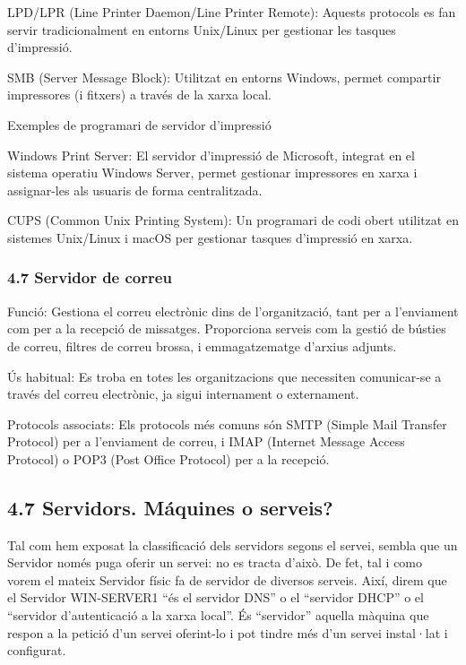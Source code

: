 \documentclass[
  a4paper,
]{article}
\begin{document}
LPD/LPR (Line Printer Daemon/Line Printer Remote): Aquests protocols es
fan servir tradicionalment en entorns Unix/Linux per gestionar les
tasques d'impressió.

SMB (Server Message Block): Utilitzat en entorns Windows, permet
compartir impressores (i fitxers) a través de la xarxa local.

Exemples de programari de servidor d'impressió

Windows Print Server: El servidor d'impressió de Microsoft, integrat en
el sistema operatiu Windows Server, permet gestionar impressores en
xarxa i assignar-les als usuaris de forma centralitzada.

CUPS (Common Unix Printing System): Un programari de codi obert
utilitzat en sistemes Unix/Linux i macOS per gestionar tasques
d'impressió en xarxa.

\subsubsection{4.7 Servidor de correu}\label{servidor-de-correu}

Funció: Gestiona el correu electrònic dins de l'organització, tant per a
l'enviament com per a la recepció de missatges. Proporciona serveis com
la gestió de bústies de correu, filtres de correu brossa, i
emmagatzematge d'arxius adjunts.

Ús habitual: Es troba en totes les organitzacions que necessiten
comunicar-se a través del correu electrònic, ja sigui internament o
externament.

Protocols associats: Els protocols més comuns són SMTP (Simple Mail
Transfer Protocol) per a l'enviament de correu, i IMAP (Internet Message
Access Protocol) o POP3 (Post Office Protocol) per a la recepció.

\subsection{4.7 Servidors. Máquines o
serveis?}\label{servidors.-muxe1quines-o-serveis}

Tal com hem exposat la classificació dels servidors segons el servei,
sembla que un Servidor només puga oferir un servei: no es tracta d'això.
De fet, tal i como vorem el mateix Servidor físic fa de servidor de
diversos serveis. Així, direm que el Servidor WIN-SERVER1 ``és el
servidor DNS'' o el ``servidor DHCP'' o el ``servidor d'autenticació a
la xarxa local''. És ``servidor'' aquella màquina que respon a la
petició d'un servei oferint-lo i pot tindre més d'un servei instal·lat i
configurat.
\end{document}
